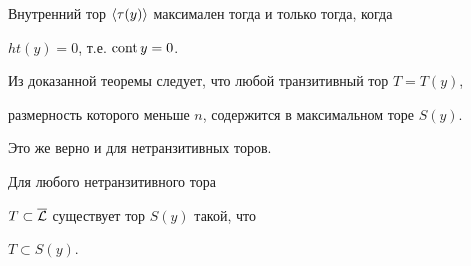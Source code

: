 \begin{cornonum}


Внутренний тор $\langle\tau(y)\rangle$ максимален тогда и только тогда, когда


$ht(y)=0$, т.е. $\operatorname{cont} y=0$.


\end{cornonum}





Из доказанной теоремы следует, что любой транзитивный тор $T=T(y)$,


размерность которого меньше $n$, содержится в максимальном торе $S(y)$.


Это же верно и для нетранзитивных торов.





\begin{thm}


Для любого нетранзитивного тора


$T\subset\overline{\cal L}$ существует тор $S(y)$ такой, что


$T\subset S(y)$.


\end{thm}





